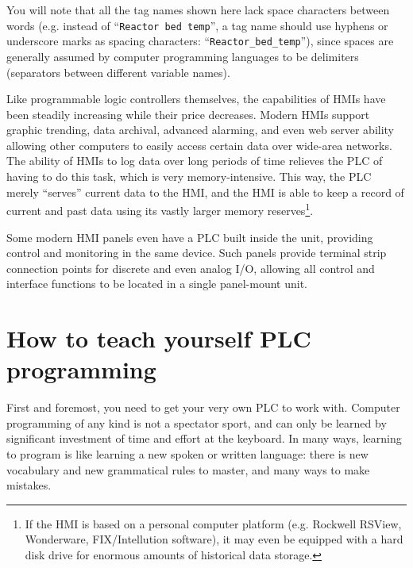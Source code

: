 You will note that all the tag names shown here lack space characters between words (e.g. instead of ``\texttt{Reactor bed temp}'', a tag name should use hyphens or underscore marks as spacing characters: ``\texttt{Reactor\_bed\_temp}''), since spaces are generally assumed by computer programming languages to be delimiters (separators between different variable names).

\vskip 10pt

Like programmable logic controllers themselves, the capabilities of HMIs have been steadily increasing while their price decreases.  Modern HMIs support graphic trending, data archival, advanced alarming, and even web server ability allowing other computers to easily access certain data over wide-area networks.  The ability of HMIs to log data over long periods of time relieves the PLC of having to do this task, which is very memory-intensive.  This way, the PLC merely ``serves'' current data to the HMI, and the HMI is able to keep a record of current and past data using its vastly larger memory reserves\footnote{If the HMI is based on a personal computer platform (e.g. Rockwell RSView, Wonderware, FIX/Intellution software), it may even be equipped with a hard disk drive for enormous amounts of historical data storage.}.      
  
Some modern HMI panels even have a PLC built inside the unit, providing control and monitoring in the same device.  Such panels provide terminal strip connection points for discrete and even analog I/O, allowing all control and interface functions to be located in a single panel-mount unit.







\filbreak
\section{How to teach yourself PLC programming}

First and foremost, you need to get your very own PLC to work with.  Computer programming of any kind is not a spectator sport, and can only be learned by significant investment of time and effort at the keyboard.  In many ways, learning to program is like learning a new spoken or written language: there is new vocabulary and new grammatical rules to master, and many ways to make mistakes.

